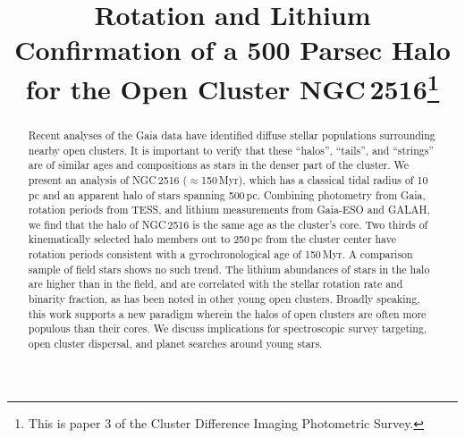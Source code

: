 \documentclass[12pt,twocolumn,tighten]{aastex63}
\begin{document}

\title{
  Rotation and Lithium Confirmation of a 500 Parsec Halo for the Open
  Cluster NGC\,2516\footnote{This is paper 3 of the Cluster Difference
  Imaging Photometric Survey.}
}



%
%
\begin{abstract}
  Recent analyses of the Gaia data have identified diffuse stellar
  populations surrounding nearby open clusters.  It is important to
  verify that these ``halos'', ``tails'', and ``strings'' are of
  similar ages and compositions as stars in the denser part of the
  cluster.  We present an analysis of NGC\,2516 ($\approx$150\,Myr),
  which has a classical tidal radius of 10\,pc and an apparent halo of
  stars spanning 500\,pc.  Combining photometry from Gaia, rotation
  periods from TESS, and lithium measurements from Gaia-ESO and GALAH,
  we find that the halo of NGC\,2516 is the same age as the cluster's
  core.  Two thirds of kinematically selected halo members out to
  250\,pc from the cluster center have rotation periods consistent
  with a gyrochronological age of 150\,Myr.  A comparison sample of
  field stars shows no such trend.  The lithium abundances of stars in
  the halo are higher than in the field, and are correlated with the
  stellar rotation rate and binarity fraction, as has been
  noted in other young open clusters.  Broadly speaking,
  this work supports a new paradigm wherein the halos of open clusters
  are often more populous than their cores.  We discuss implications
  for spectroscopic survey targeting, open cluster dispersal, and
  planet searches around young stars.
\end{abstract}


\end{document}
